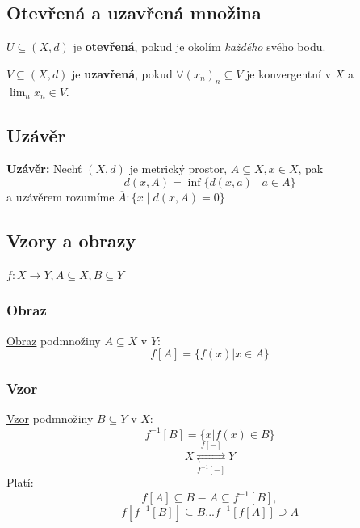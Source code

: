 \documentclass[../main.tex]{subfiles}
\begin{document}
\subsection{Otevřená a uzavřená množina}
\hspace{1.2mm}
$U \subseteq (X,d)$ je \textbf{otevřená}, pokud je okolím \textit{každého} svého bodu.

\vspace{5mm}

\noindent
\hspace{1.2mm}
$V \subseteq (X,d)$ je \textbf{uzavřená}, pokud $\forall (x_n)_n \subseteq V$ je konvergentní
v $X$ a $\lim_n x_n \in V$.

\subsection{Uzávěr}
\hspace{1.2mm}
\textbf{Uzávěr:} Nechť $(X,d)$ je metrický prostor, $A \subseteq X, x\in X$, pak 
\[d(x,A) = \inf\{d(x,a)\mid a \in A\}\]
a uzávěrem rozumíme $\overline{A} : \{x \mid d(x,A) = 0\}$

\subsection{Vzory a obrazy}
\hspace{1.2mm}
$f: X \rightarrow Y, A \subseteq X, B \subseteq Y$
\subsubsection{Obraz}
\hspace{1.2mm}
\underline{Obraz} podmnožiny $A\subseteq X$ v $Y$:
\[f[A] = \{f(x) | x \in A\}\]

\subsubsection{Vzor}
\hspace{1.2mm}
\underline{Vzor} podmnožiny $B\subseteq Y$ v $X$:
\[f^{-1}[B] = \{x | f(x) \in B\}\]
\[X \underset{f^{-1}[-]}{\stackrel{f[-]}{\rightleftarrows}} Y\]
\hspace{1.2mm}
Platí:
\[f[A] \subseteq B \equiv A \subseteq f^{-1}[B],\]
\[f[f^{-1}[B]] \subseteq B  ...  f^{-1}[f[A]] \supseteq A\]
\end{document}
